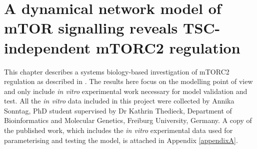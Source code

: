 \graphicspath{{Chapter5/Chapter5Figs/}}

\chapter{A dynamical network model of mTOR signalling reveals TSC-independent mTORC2 regulation}
\label{chap:A dynamical network model of mTOR signalling reveals TSC-independent mTORC2 regulation}
This chapter describes a systems biology-based investigation of mTORC2 regulation as described in \citep{DallePezze2012a}. The results here focus on the modelling point of view and only include \emph{in vitro} experimental work necessary for model validation and test. All the \emph{in vitro} data included in this project were collected by Annika Sonntag, PhD student supervised by Dr Kathrin Thedieck, Department of Bioinformatics and Molecular Genetics, Freiburg University, Germany. A copy of the published work, which includes the \emph{in vitro} experimental data used for parameterising and testing the model, is attached in Appendix \ref{appendixA}.

